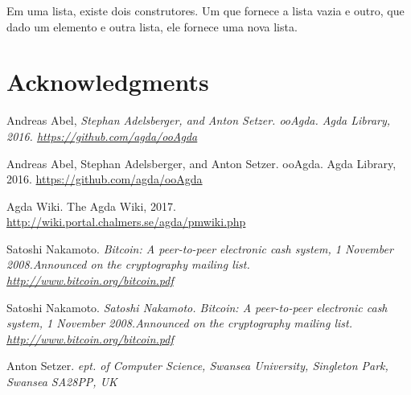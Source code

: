 \documentclass[12pt]{report}
\begin{document}

Em uma lista, existe dois construtores. Um que fornece a lista vazia e outro, que dado um elemento e outra lista, ele fornece uma nova lista.



\newpage
\section{Acknowledgments}

\newpage
 
\begin{thebibliography}{111}

    Andreas Abel, 
    {\it Stephan Adelsberger, and Anton Setzer. ooAgda. Agda Library, 2016. 
    \url{https://github.com/agda/ooAgda}}
    
    Andreas Abel, Stephan Adelsberger, and Anton Setzer. ooAgda. Agda Library, 2016. 
    \url{https://github.com/agda/ooAgda}

    Agda Wiki.  The Agda Wiki, 2017.  
    \url{http://wiki.portal.chalmers.se/agda/pmwiki.php}
    
    Satoshi Nakamoto.  
    {\it Bitcoin:  A peer-to-peer electronic cash system, 1 November 2008.Announced on the cryptography mailing list. \url{http://www.bitcoin.org/bitcoin.pdf}}

    Satoshi Nakamoto.  
    {\it Satoshi Nakamoto.  Bitcoin:  A peer-to-peer electronic cash system, 1 November 2008.Announced on the cryptography mailing list. \url{http://www.bitcoin.org/bitcoin.pdf}}

    Anton Setzer.  
    {\it ept. of Computer Science, Swansea University, Singleton Park, Swansea SA28PP, UK}

\end{thebibliography}
\end{document}
